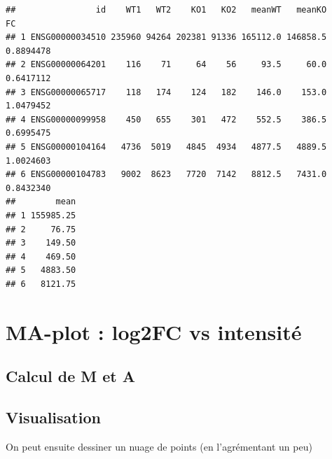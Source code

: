 \documentclass[
]{book}
\newenvironment{Shaded}{\begin{snugshade}}{\end{snugshade}}
\newcommand{\DecValTok}[1]{\textcolor[rgb]{0.00,0.00,0.81}{#1}}
\newcommand{\FunctionTok}[1]{\textcolor[rgb]{0.00,0.00,0.00}{#1}}
\newcommand{\NormalTok}[1]{#1}
\newcommand{\OtherTok}[1]{\textcolor[rgb]{0.56,0.35,0.01}{#1}}
\newcommand{\SpecialCharTok}[1]{\textcolor[rgb]{0.00,0.00,0.00}{#1}}
\begin{document}
\begin{verbatim}
##                id    WT1   WT2    KO1   KO2   meanWT   meanKO        FC
## 1 ENSG00000034510 235960 94264 202381 91336 165112.0 146858.5 0.8894478
## 2 ENSG00000064201    116    71     64    56     93.5     60.0 0.6417112
## 3 ENSG00000065717    118   174    124   182    146.0    153.0 1.0479452
## 4 ENSG00000099958    450   655    301   472    552.5    386.5 0.6995475
## 5 ENSG00000104164   4736  5019   4845  4934   4877.5   4889.5 1.0024603
## 6 ENSG00000104783   9002  8623   7720  7142   8812.5   7431.0 0.8432340
##        mean
## 1 155985.25
## 2     76.75
## 3    149.50
## 4    469.50
## 5   4883.50
## 6   8121.75
\end{verbatim}

\hypertarget{ma-plot-log2fc-vs-intensituxe9}{%
\section{MA-plot : log2FC vs intensité}\label{ma-plot-log2fc-vs-intensituxe9}}

\hypertarget{calcul-de-m-et-a}{%
\subsection{Calcul de M et A}\label{calcul-de-m-et-a}}

\begin{Shaded}
\end{Shaded}

\hypertarget{visualisation}{%
\subsection{Visualisation}\label{visualisation}}

On peut ensuite dessiner un nuage de points (en l'agrémentant un peu)
\end{document}
